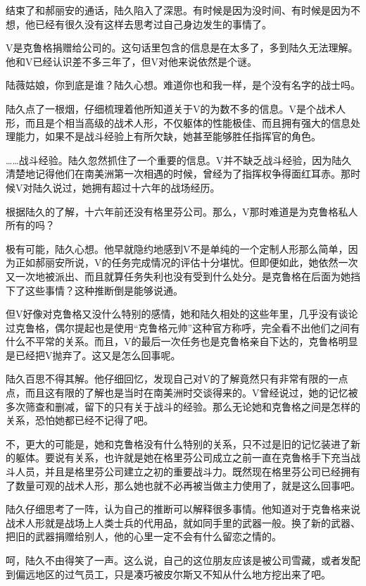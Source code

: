 结束了和郝丽安的通话，陆久陷入了深思。有时候是因为没时间、有时候是因为不想，他已经有很久没有这样去思考过自己身边发生的事情了。

V是克鲁格捐赠给公司的。这句话里包含的信息是在太多了，多到陆久无法理解。他和V已经认识差不多三年了，但V对他来说依然是个谜。

陆薇姑娘，你到底是谁？陆久心想。难道你也和我一样，是个没有名字的战士吗。

陆久点了一根烟，仔细梳理着他所知道关于V的为数不多的信息。V是个战术人形，而且是个相当高级的战术人形，不仅躯体的性能极佳、而且拥有强大的信息处理能力，如果不是战斗经验上有所欠缺，她甚至能够胜任指挥官的角色。

……战斗经验。陆久忽然抓住了一个重要的信息。V并不缺乏战斗经验，因为陆久清楚地记得他们在南美洲第一次相遇的时候，曾经为了指挥权争得面红耳赤。那时候V对陆久说过，她拥有超过十六年的战场经历。

根据陆久的了解，十六年前还没有格里芬公司。那么，V那时难道是为克鲁格私人所有的吗？

极有可能，陆久心想。他早就隐约地感到V不是单纯的一个定制人形那么简单，因为正如郝丽安所说，V的任务完成情况的评估十分堪忧。但即便如此，她依然一次又一次地被派出、而且就算任务失利也没有受到什么处分。是克鲁格在后面为她挡下了这些事情？这种推断倒是能够说通。

但V好像对克鲁格又没什么特别的感情，她和陆久相处的这些年里，几乎没有谈论过克鲁格，偶尔提起也是使用“克鲁格元帅”这种官方称呼，完全看不出他们之间有什么不平常的关系。而且，V的最后一次任务也是克鲁格亲自下达的，克鲁格明显是已经把V抛弃了。这又是怎么回事呢。

陆久百思不得其解。他仔细回忆，发现自己对V的了解竟然只有非常有限的一点点，而且这有限的了解也是当时在南美洲时交谈得来的。V曾经说过，她的记忆被多次筛查和删减，留下的只有关于战斗的经验。那么无论她和克鲁格之间是怎样的关系，恐怕她都已经不记得了吧。

不，更大的可能是，她和克鲁格没有什么特别的关系，只不过是旧的记忆装进了新的躯体。要说有关系，也许就是她在格里芬公司成立之前一直在克鲁格手下充当战斗人员，并且是格里芬公司建立之初的重要战斗力。既然现在格里芬公司已经拥有了数量可观的战术人形，那么她也就不必再被当做主力使用了，就是这么回事吧。

陆久仔细思考了一阵，认为自己的推断可以解释很多事情。他知道对于克鲁格来说战术人形就是战场上人类士兵的代用品，就如同手里的武器一般。换了新的武器、把旧的武器捐赠给别人，他的心里一定不会有什么留恋之情的。

呵，陆久不由得笑了一声。这么说，自己的这位朋友应该是被公司雪藏，或者发配到偏远地区的过气员工，只是凑巧被皮尔斯又不知从什么地方挖出来了吧。


